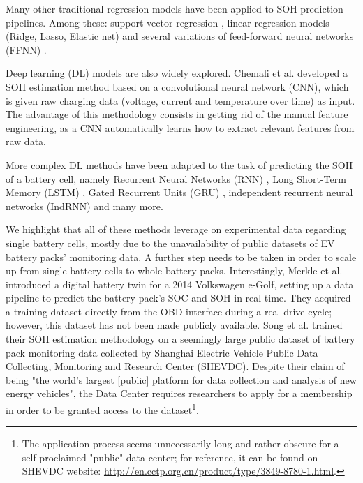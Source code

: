 Many other traditional regression models have been applied to SOH prediction pipelines. Among these: support vector regression \cite{soh_svr}, linear regression models (Ridge, Lasso, Elastic net) \cite{soh_ridge} and several variations of feed-forward neural networks (FFNN) \cite{soh_nn1, soh_nn2, soh_nn3}.

Deep learning (DL) models are also widely explored. Chemali et al. \cite{auto_extr_soh_2} developed a SOH estimation method based on a convolutional neural network (CNN), which is given raw charging data (voltage, current and temperature over time) as input. The advantage of this methodology consists in getting rid of the manual feature engineering, as a CNN automatically learns how to extract relevant features from raw data.

More complex DL methods have been adapted to the task of predicting the SOH of a battery cell, namely Recurrent Neural Networks (RNN) \cite{soh_rnn}, Long Short-Term Memory (LSTM) \cite{soh_lstm}, Gated Recurrent Units (GRU) \cite{soh_gru}, independent recurrent neural networks (IndRNN) \cite{soh_indrnn} and many more.

\smallskip

We highlight that all of these methods leverage on experimental data regarding single battery cells, mostly due to the unavailability of public datasets of EV battery packs' monitoring data. A further step needs to be taken in order to scale up from single battery cells to whole battery packs. Interestingly, Merkle et al. \cite{soh_digital_twin} introduced a digital battery twin for a 2014 Volkswagen e-Golf, setting up a data pipeline to predict the battery pack's SOC and SOH in real time. They acquired a training dataset directly from the OBD interface during a real drive cycle; however, this dataset has not been made publicly available. Song et al. \cite{manual_extr_soh_7} trained their SOH estimation methodology on a seemingly large public dataset of battery pack monitoring data collected by Shanghai Electric Vehicle Public Data Collecting, Monitoring and Research Center (SHEVDC). Despite their claim of being "the world's largest [public] platform for data collection and analysis of new energy vehicles", the Data Center requires researchers to apply for a membership in order to be granted access to the dataset\footnote{The application process seems unnecessarily long and rather obscure for a self-proclaimed "public" data center; for reference, it can be found on SHEVDC website: \url{http://en.cctp.org.cn/product/type/3849-8780-1.html}.}.

